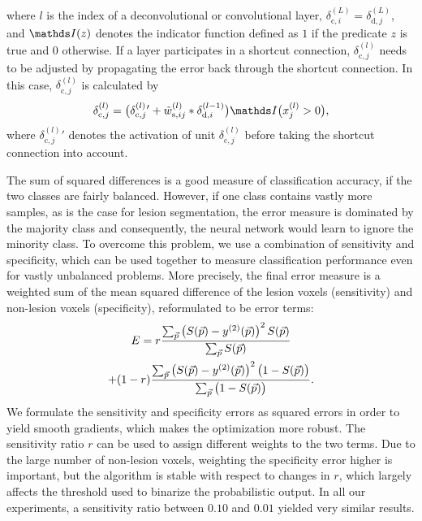 where $l$ is the index of a deconvolutional or convolutional layer,
$\delta^{(L)}_{\text{c},i} = \delta^{(L)}_{\text{d},j}$, and $\I(z)$ denotes the
indicator function defined as $1$ if the predicate $z$ is true and $0$
otherwise. If a layer participates in a shortcut connection,
$\delta^{(l)}_{\text{c},j}$ needs to be adjusted by propagating the error back
through the shortcut connection. In this case, $\delta^{(l)}_{\text{c},j}$ is
calculated by
\begin{equation}
\delta^{(l)}_{\text{c},j} =
\big(\delta^{(l)}_{\text{c},j}{}'+
\tilde{w}^{(l)}_{\text{s},ij}*\delta^{(l-1)}_{\text{d},i}\big)\I\big(x^{(l)}_j
> 0\big),
\label{eq:deltas}
\end{equation}
where $\delta^{(l)}_{\text{c},j}{}'$ denotes the activation of unit
$\delta^{(l)}_{\text{c},j}$ before taking the shortcut connection into account.


The sum of squared differences is a good measure of classification accuracy, if
the two classes are fairly balanced. However, if one class contains vastly more
samples, as is the case for lesion segmentation, the error measure is dominated
by the majority class and consequently, the neural network would learn to ignore
the minority class. To overcome this problem, we use a combination of
sensitivity and specificity, which can be used together to measure
classification performance even for vastly unbalanced problems. More precisely,
the final error measure is a weighted sum of the mean squared difference of the
lesion voxels (sensitivity) and non-lesion voxels (specificity), reformulated to
be error terms:
\begin{multline} 
E = r\frac{\textstyle\sum_{\vect{p}} \left(S(\vect{p}) -
y^{(2)}(\vect{p})\right)^2 S(\vect{p})}{\textstyle\sum_{\vect{p}} S(\vect{p})}
\\
 + (1-r)\frac{\textstyle\sum_{\vect{p}} \left(S(\vect{p}) -
y^{(2)}(\vect{p})\right)^2 \big(1 - S(\vect{p})\big)}{%
\textstyle\sum_{\vect{p}}\big(1 - S(\vect{p})\big)}.
\end{multline}
We formulate the sensitivity and specificity errors as squared errors in order
to yield smooth gradients, which makes the optimization more robust. The
sensitivity ratio $r$ can be used to assign different weights to the two terms.
Due to the large number of non-lesion voxels, weighting the specificity error
higher is important, but the algorithm is stable with respect to changes in $r$,
which largely affects the threshold used to binarize the probabilistic output.
In all our experiments, a sensitivity ratio between $0.10$ and $0.01$ yielded
very similar results.

